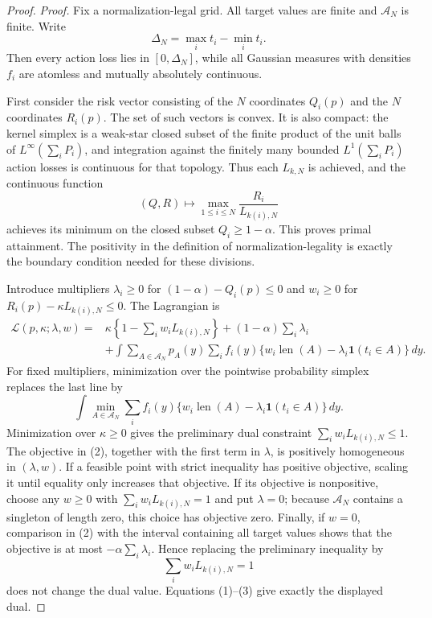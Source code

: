 \documentclass{article}
\begin{document}
\begin{proof}
\textit{Proof.}
Fix a normalization-legal grid.  All target values are finite and \(\mathcal A_N\) is finite.  Write
\[
 \Delta_N=\max_i t_i-\min_i t_i.
\]
Then every action loss lies in \([0,\Delta_N]\), while all Gaussian measures with densities \(f_i\) are atomless and mutually absolutely continuous.

First consider the risk vector consisting of the \(N\) coordinates \(Q_i(p)\) and the \(N\) coordinates \(R_i(p)\).  The set of such vectors is convex.  It is also compact: the kernel simplex is a weak-star closed subset of the finite product of the unit balls of \(L^\infty(\sum_iP_i)\), and integration against the finitely many bounded \(L^1(\sum_iP_i)\) action losses is continuous for that topology.  Thus each \(L_{k,N}\) is achieved, and the continuous function
\[
 (Q,R)\longmapsto\max_{1\leq i\leq N}\frac{R_i}{L_{k(i),N}}
\]
achieves its minimum on the closed subset \(Q_i\geq1-\alpha\).  This proves primal attainment.  The positivity in the definition of normalization-legality is exactly the boundary condition needed for these divisions.

Introduce multipliers \(\lambda_i\geq0\) for
\((1-\alpha)-Q_i(p)\leq0\) and \(w_i\geq0\) for
\(R_i(p)-\kappa L_{k(i),N}\leq0\).  The Lagrangian is
\[
\begin{split}
 \mathcal L(p,\kappa;\lambda,w)
 ={}&\kappa\left\{1-\sum_iw_iL_{k(i),N}\right\}
 +(1-\alpha)\sum_i\lambda_i\\
 &+\int\sum_{A\in\mathcal A_N}p_A(y)
 \sum_i f_i(y)\{w_i\operatorname{len}(A)-\lambda_i\mathbf1(t_i\in A)\}\,dy.
\end{split}
\tag{1}
\]
For fixed multipliers, minimization over the pointwise probability simplex replaces the last line by
\[
 \int\min_{A\in\mathcal A_N}\sum_i f_i(y)
 \{w_i\operatorname{len}(A)-\lambda_i\mathbf1(t_i\in A)\}\,dy.
\tag{2}
\]
Minimization over \(\kappa\geq0\) gives the preliminary dual constraint
\(\sum_iw_iL_{k(i),N}\leq1\).  The objective in (2), together with the first term in \(\lambda\), is positively homogeneous in \((\lambda,w)\).  If a feasible point with strict inequality has positive objective, scaling it until equality only increases that objective.  If its objective is nonpositive, choose any \(w\geq0\) with \(\sum_iw_iL_{k(i),N}=1\) and put \(\lambda=0\); because \(\mathcal A_N\) contains a singleton of length zero, this choice has objective zero.  Finally, if \(w=0\), comparison in (2) with the interval containing all target values shows that the objective is at most \(-\alpha\sum_i\lambda_i\).  Hence replacing the preliminary inequality by
\[
 \sum_iw_iL_{k(i),N}=1
\tag{3}
\]
does not change the dual value.  Equations (1)--(3) give exactly the displayed dual.


\end{proof}
\end{document}
